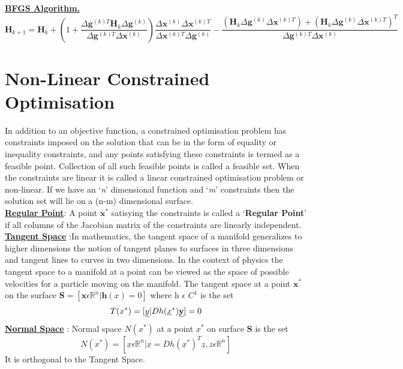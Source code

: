 \documentclass[12pt,a4paper,titlepage]{article}
\begin{document}
\textbf{\underline{BFGS Algorithm.}}
\begin{equation}
    \textbf{H}_{k+1}= \textbf{H}_{k}+ (1+\frac{\Delta \textbf{g}^{(k)T}\textbf{H}_{k}\Delta\textbf{g}^{(k)}}{\Delta\textbf{g}^{(k)T}\Delta\textbf{x}^{(k)}})\frac{\Delta\textbf{x}^{(k)}\Delta\textbf{x}^{(k)T}}{\Delta\textbf{x}^{(k)T}\Delta\textbf{g}^{(k)}} - \frac{(\textbf{H}_{k}\Delta\textbf{g}^{(k)}\Delta\textbf{x}^{(k)T})+(\textbf{H}_{k}\Delta\textbf{g}^{(k)}\Delta\textbf{x}^{(k)T})^{T}}{\Delta\textbf{g}^{(k)T}\Delta\textbf{x}^{(k)}}
\end{equation}

\section{Non-Linear Constrained Optimisation}
In addition to an objective function, a constrained optimisation problem has constraints imposed on the solution that can be in the form of equality or inequality constraints, and any points satisfying these constraints is termed as a feasible point. Collection of all such feasible points is called a feasible set. When the constraints are linear it is called a linear constrained optimisation problem or non-linear. If we have an `\textit{n}' dimensional function and `\textit{m}' constraints then the solution set will lie on a (n-m) dimensional surface.\\[1\baselineskip]
\textbf{\underline{Regular Point}}: A point $\textbf{x}^{*}$ satisying the constraints is called a `\textbf{Regular Point}' if all columns of the Jacobian matrix of the constraints are linearly independent.\\
\textbf{\underline{Tangent Space}} :In mathematics, the tangent space of a manifold generalizes to higher dimensions the notion of tangent planes to surfaces in three dimensions and tangent lines to curves in two dimensions. In the context of physics the tangent space to a manifold at a point can be viewed as the space of possible velocities for a particle moving on the manifold. The tangent space at a point $\textbf{x}^{*}$ on the surface $\textbf{S}= [\textbf{x}\epsilon \mathbb{R}^{n} | \textbf{h}(x)=0]$ where h $\epsilon$ $C^{1}$ is the set
\begin{equation}
    T(x^{*})= [\underline{y} | Dh(\underline{x}^{*})\textbf{\underline{y}}]= 0
\end{equation}
\textbf{\underline{Normal Space}} : Normal space $N(x^{*})$ at a point $x^{*}$ on surface \textbf{S} is the set
\begin{equation}
    N(x^{*})= [\underline{x} \epsilon \mathbb{R}^{n} | \underline{x} = Dh(\underline{x}^{*})^{T}\underline{z}, z \epsilon \mathbb{R}^{n}]
\end{equation}
It is orthogonal to the Tangent Space.
\end{document}
